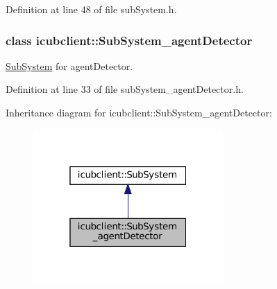 Definition at line 48 of file sub\+System.\+h.

\label{classicubclient_1_1SubSystem__agentDetector}
\subsubsection{class icubclient\+:\+:Sub\+System\+\_\+agent\+Detector}
\hyperlink{group__icubclient__subsystems_classicubclient_1_1SubSystem}{Sub\+System} for agent\+Detector. 

Definition at line 33 of file sub\+System\+\_\+agent\+Detector.\+h.



Inheritance diagram for icubclient\+:\+:Sub\+System\+\_\+agent\+Detector\+:
\nopagebreak
\begin{figure}[H]
\begin{center}
\leavevmode
\includegraphics[width=205pt]{classicubclient_1_1SubSystem__agentDetector__inherit__graph}
\end{center}
\end{figure}
